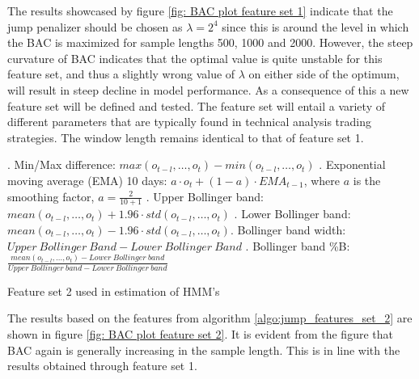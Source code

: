 The results showcased by figure \ref{fig: BAC plot feature set 1} indicate that the jump penalizer should be chosen as $\lambda = 2^4$ since this is around the level in which the BAC is maximized for sample lengths 500, 1000 and 2000. However, the steep curvature of BAC indicates that the optimal value is quite unstable for this feature set, and thus a slightly wrong value of $\lambda$ on either side of the optimum, will result in steep decline in model performance. As a consequence of this a new feature set will be defined and tested. The feature set will entail a variety of different parameters that are typically found in technical analysis trading strategies. The window length remains identical to that of feature set 1.

\begin{algorithm}[H]
. Min/Max difference: $max(o_{t-l},\ldots,o_{t}) - min(o_{t-l},\ldots,o_{t})$ . Exponential moving average (EMA) 10 days: $a \cdot o_t + (1-a) \cdot EMA_{t-1}$, \quad where $a$ is the smoothing factor, $a = \frac{2}{10+1}$ . Upper Bollinger band: $mean(o_{t-l},\ldots,o_t) + 1.96 \cdot std(o_{t-l},\ldots,o_t)$ . Lower Bollinger band: $mean(o_{t-l},\ldots,o_t) - 1.96 \cdot std(o_{t-l},\ldots,o_t)$. Bollinger band width: $Upper\ Bollinger\ Band - Lower\  Bollinger\ Band$ . Bollinger band \%B: $\frac{mean(o_{t-l},\ldots,o_{t}) - Lower\ Bollinger\ band} {Upper\ Bollinger\ band - Lower\ Bollinger\ band}$  \;
\BlankLine
{}
\caption{Feature set 2 used in \jump estimation of HMM's}
\label{algo:jump_features_set_2}
\end{algorithm}

The results based on the features from algorithm \ref{algo:jump_features_set_2} are shown in figure \ref{fig: BAC plot feature set 2}. It is evident from the figure that BAC again is generally increasing in the sample length. This is in line with the results obtained through feature set 1.

